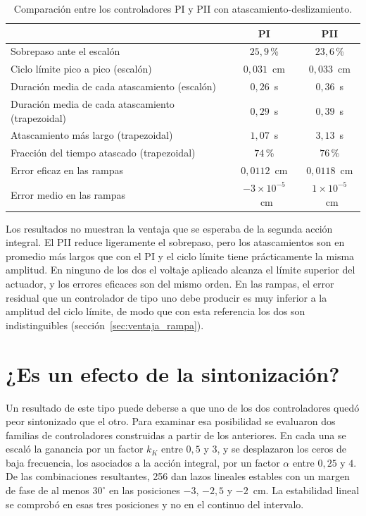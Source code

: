 \begin{table}[ht]
\centering
\caption{Comparación entre los controladores PI y PII con atascamiento-deslizamiento.}
\label{tab:pi_pii}
\begin{tabular}{|l|c|c|}
\hline
 & PI & PII \\ \hline
Sobrepaso ante el escalón & $25{,}9$\,\% & $23{,}6$\,\% \\ \hline
Ciclo límite pico a pico (escalón) & $0{,}031$~cm & $0{,}033$~cm \\ \hline
Duración media de cada atascamiento (escalón) & $0{,}26$~s & $0{,}36$~s \\ \hline
Duración media de cada atascamiento (trapezoidal) & $0{,}29$~s & $0{,}39$~s \\ \hline
Atascamiento más largo (trapezoidal) & $1{,}07$~s & $3{,}13$~s \\ \hline
Fracción del tiempo atascado (trapezoidal) & $74$\,\% & $76$\,\% \\ \hline
Error eficaz en las rampas & $0{,}0112$~cm & $0{,}0118$~cm \\ \hline
Error medio en las rampas & $-3\times10^{-5}$~cm & $1\times10^{-5}$~cm \\ \hline
\end{tabular}
\end{table}

Los resultados no muestran la ventaja que se esperaba de la segunda acción integral. El PII reduce ligeramente el sobrepaso, pero los atascamientos son en promedio más largos que con el PI y el ciclo límite tiene prácticamente la misma amplitud. En ninguno de los dos el voltaje aplicado alcanza el límite superior del actuador, y los errores eficaces son del mismo orden. En las rampas, el error residual que un controlador de tipo uno debe producir es muy inferior a la amplitud del ciclo límite, de modo que con esta referencia los dos son indistinguibles (sección~\ref{sec:ventaja_rampa}).

\section{¿Es un efecto de la sintonización?}\label{sec:barrido_familias}

Un resultado de este tipo puede deberse a que uno de los dos controladores quedó peor sintonizado que el otro. Para examinar esa posibilidad se evaluaron dos familias de controladores construidas a partir de los anteriores. En cada una se escaló la ganancia por un factor $k_K$ entre $0{,}5$ y $3$, y se desplazaron los ceros de baja frecuencia, los asociados a la acción integral, por un factor $\alpha$ entre $0{,}25$ y $4$. De las combinaciones resultantes, 256 dan lazos lineales estables con un margen de fase de al menos $30^\circ$ en las posiciones $-3$, $-2{,}5$ y $-2$~cm. La estabilidad lineal se comprobó en esas tres posiciones y no en el continuo del intervalo.

